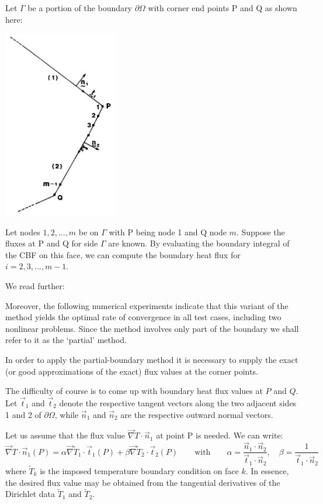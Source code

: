 Let $\Gamma$ be a portion of the boundary $\partial \Omega$ 
with corner end points P and Q as shown here:
\begin{center}
\includegraphics[width=5cm]{python_codes/fieldstone_173/images/cacs85.png}
\end{center}

Let nodes $1,2, ..., m$ be on $\Gamma$ with P being node 1 and Q node $m$.
Suppose the fluxes at P and Q for side $\Gamma$ are known. 
By evaluating the boundary integral of the CBF on this face, we can compute the 
boundary heat flux for $i=2,3, ...,m-1$.

We read further:
\begin{displayquote}
Moreover, the following numerical
experiments indicate that this variant of the method yields the optimal rate of convergence in
all test cases, including two nonlinear problems. Since the method involves only part of the
boundary we shall refer to it as the `partial' method.

In order to apply the partial-boundary method it is necessary to supply the exact (or good
approximations of the exact) flux values at the corner points.
\end{displayquote}

The difficulty of course is to come up with boundary heat flux values at $P$ and $Q$.
Let $\vec{t}_1$ and $\vec{t}_2$ denote the respective tangent vectors along the two adjacent 
sides 1 and 2 of $\partial\Omega$, while $\vec{n}_1$ and $\vec{n}_2$
are the respective outward normal vectors.

Let us assume that the flux value $\vec\nabla T \cdot \vec{n}_1$ at point P is needed.
We can write:
\[
\vec\nabla T \cdot \vec{n}_1(P) = 
\alpha \vec\nabla \tilde{T}_1 \cdot \vec{t}_1(P)
+
\beta \vec\nabla \tilde{T}_2 \cdot \vec{t}_2(P)
\qquad
\text{with}
\qquad
\alpha = \frac{\vec{n}_1 \cdot \vec{n}_2 }{\vec{t}_1 \cdot \vec{n}_2},
\quad
\beta = \frac{1 }{\vec{t}_1 \cdot \vec{n}_2}
\] 
where $\tilde{T}_k$ is the imposed temperature boundary condition on face $k$.
In essence, the desired flux value may be obtained from the tangential derivatives of the Dirichlet
data $\tilde{T}_1$ and $\tilde{T}_2$. 

